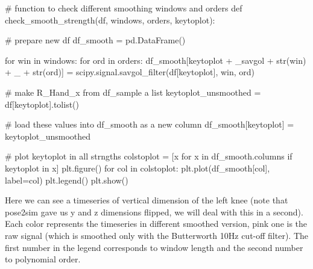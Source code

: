 \documentclass[
  letterpaper,
  DIV=11,
  numbers=noendperiod]{scrreprt}
\newenvironment{Shaded}{\begin{snugshade}}{\end{snugshade}}
\newcommand{\BuiltInTok}[1]{\textcolor[rgb]{0.00,0.23,0.31}{#1}}
\newcommand{\CommentTok}[1]{\textcolor[rgb]{0.37,0.37,0.37}{#1}}
\newcommand{\ControlFlowTok}[1]{\textcolor[rgb]{0.00,0.23,0.31}{#1}}
\newcommand{\KeywordTok}[1]{\textcolor[rgb]{0.00,0.23,0.31}{#1}}
\newcommand{\NormalTok}[1]{\textcolor[rgb]{0.00,0.23,0.31}{#1}}
\newcommand{\OperatorTok}[1]{\textcolor[rgb]{0.37,0.37,0.37}{#1}}
\newcommand{\StringTok}[1]{\textcolor[rgb]{0.13,0.47,0.30}{#1}}
\begin{document}
\begin{Shaded}
\begin{Highlighting}[]
\CommentTok{\# function to check different smoothing windows and orders}
\KeywordTok{def}\NormalTok{ check\_smooth\_strength(df, windows, orders, keytoplot):}

    \CommentTok{\# prepare new df}
\NormalTok{    df\_smooth }\OperatorTok{=}\NormalTok{ pd.DataFrame()}

    \ControlFlowTok{for}\NormalTok{ win }\KeywordTok{in}\NormalTok{ windows:}
        \ControlFlowTok{for} \BuiltInTok{ord} \KeywordTok{in}\NormalTok{ orders:}
\NormalTok{            df\_smooth[keytoplot }\OperatorTok{+} \StringTok{\textquotesingle{}\_savgol\textquotesingle{}} \OperatorTok{+} \BuiltInTok{str}\NormalTok{(win) }\OperatorTok{+} \StringTok{\textquotesingle{}\_\textquotesingle{}} \OperatorTok{+} \BuiltInTok{str}\NormalTok{(}\BuiltInTok{ord}\NormalTok{)] }\OperatorTok{=}\NormalTok{ scipy.signal.savgol\_filter(df[keytoplot], win, }\BuiltInTok{ord}\NormalTok{)}

    \CommentTok{\# make R\_Hand\_x from df\_sample a list}
\NormalTok{    keytoplot\_unsmoothed }\OperatorTok{=}\NormalTok{ df[keytoplot].tolist()}

    \CommentTok{\# load these values into df\_smooth as a new column}
\NormalTok{    df\_smooth[keytoplot] }\OperatorTok{=}\NormalTok{ keytoplot\_unsmoothed}

    \CommentTok{\# plot keytoplot in all strngths}
\NormalTok{    colstoplot }\OperatorTok{=}\NormalTok{ [x }\ControlFlowTok{for}\NormalTok{ x }\KeywordTok{in}\NormalTok{ df\_smooth.columns }\ControlFlowTok{if}\NormalTok{ keytoplot }\KeywordTok{in}\NormalTok{ x]}
\NormalTok{    plt.figure()}
    \ControlFlowTok{for}\NormalTok{ col }\KeywordTok{in}\NormalTok{ colstoplot:}
\NormalTok{        plt.plot(df\_smooth[col], label}\OperatorTok{=}\NormalTok{col)}
\NormalTok{    plt.legend()}
\NormalTok{    plt.show()}
\end{Highlighting}
\end{Shaded}

Here we can see a timeseries of vertical dimension of the left knee
(note that pose2sim gave us y and z dimensions flipped, we will deal
with this in a second). Each color represents the timeseries in
different smoothed version, pink one is the raw signal (which is
smoothed only with the Butterworth 10Hz cut-off filter). The first
number in the legend corresponds to window length and the second number
to polynomial order.
\end{document}
